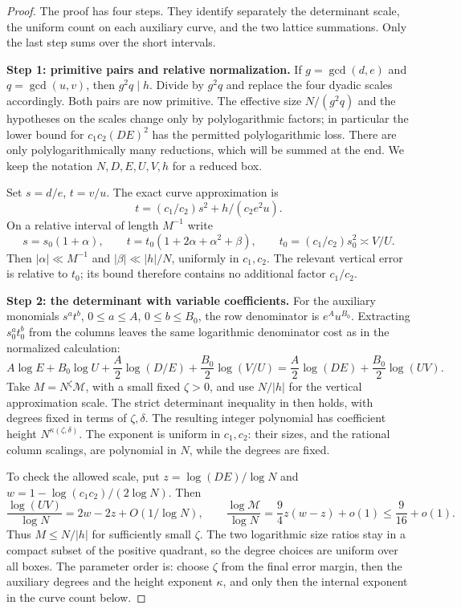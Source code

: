 \begin{proof}
The proof has four steps.  They identify separately the determinant
scale, the uniform count on each auxiliary curve, and the two lattice
summations.  Only the last step sums over the short intervals.

\medskip\noindent
\textbf{Step 1: primitive pairs and relative normalization.}
If $g=\gcd(d,e)$ and $q=\gcd(u,v)$, then $g^2q\mid h$.
Divide by $g^2q$ and replace the four dyadic scales accordingly.
Both pairs are now primitive.  The effective size $N/(g^2q)$ and the
hypotheses on the scales change only by polylogarithmic factors;
in particular the lower bound for $c_1c_2(DE)^2$ has the permitted
polylogarithmic loss.  There are only polylogarithmically many reductions,
which will be summed at the end.  We keep the notation $N,D,E,U,V,h$
for a reduced box.

Set $s=d/e$, $t=v/u$.  The exact curve approximation is
\[
 t=(c_1/c_2)s^2+h/(c_2e^2u).
\]
On a relative interval of length $M^{-1}$ write
\[
 s=s_0(1+\alpha),\qquad
 t=t_0(1+2\alpha+\alpha^2+\beta),\qquad
 t_0=(c_1/c_2)s_0^2\asymp V/U.
\]
Then $|\alpha|\ll M^{-1}$ and $|\beta|\ll|h|/N$, uniformly in
$c_1,c_2$.  The relevant vertical error is relative to $t_0$;
its bound therefore contains no additional factor $c_1/c_2$.

\medskip\noindent
\textbf{Step 2: the determinant with variable coefficients.}
For the auxiliary monomials $s^at^b$, $0\leq a\leq A$,
$0\leq b\leq B_0$, the row denominator is $e^Au^{B_0}$.
Extracting $s_0^at_0^b$ from the columns leaves the same logarithmic
denominator cost as in the normalized calculation:
\[
 A\log E+B_0\log U+\frac A2\log(D/E)+\frac{B_0}2\log(V/U)
 =\frac A2\log(DE)+\frac{B_0}2\log(UV).
\]
Take $M=N^\zeta\mathcal M$, with a small fixed $\zeta>0$, and use
$N/|h|$ for the vertical approximation scale.  The strict determinant
inequality in \cite[Section~2.1, Lemma~7]{reuss2014} then holds, with
degrees fixed in terms of $\zeta,\delta$.  The resulting integer
polynomial has coefficient height $N^{\kappa(\zeta,\delta)}$.
The exponent is uniform in $c_1,c_2$: their sizes, and the rational
column scalings, are polynomial in $N$, while the degrees are fixed.

To check the allowed scale, put $z=\log(DE)/\log N$ and
$w=1-\log(c_1c_2)/(2\log N)$.  Then
\[
 \frac{\log(UV)}{\log N}=2w-2z+O(1/\log N),\qquad
 \frac{\log\mathcal M}{\log N}=\frac94z(w-z)+o(1)
                    \leq\frac9{16}+o(1).
\]
Thus $M\leq N/|h|$ for sufficiently small $\zeta$.
The two logarithmic size ratios stay in a compact subset of the positive
quadrant, so the degree choices are uniform over all boxes.
The parameter order is: choose $\zeta$ from the final error margin,
then the auxiliary degrees and the height exponent $\kappa$, and only
then the internal exponent in the curve count below.


\end{proof}
